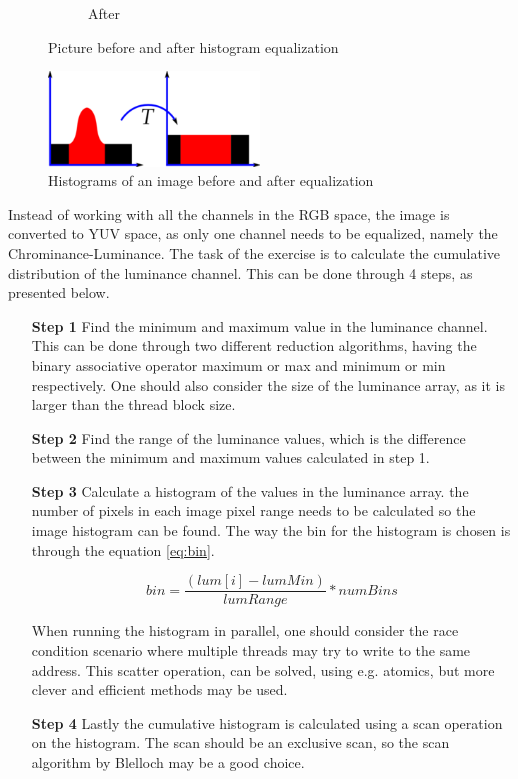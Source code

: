 \begin{figure}[ht]
\begin{subfigure}{.5\textwidth}
		\caption{After}
		\label{fig:ex3-after}
	\end{subfigure}
	\caption{Picture before and after histogram equalization}
	\label{fig:ex3}
\end{figure}  

\begin{figure}[ht]
	\centering
	\includegraphics[width=0.5\textwidth]{figs/exercises/ex3/histogram_eq.png}
	\caption{Histograms of an image before and after equalization \cite{wiki:hist_eq}}	\label{fig:histogram_eq}
\end{figure}  

Instead of working with all the channels in the RGB space, the image is converted to YUV space, as only one channel needs to be equalized, namely the Chrominance-Luminance. The task of the exercise is to calculate the cumulative distribution of the luminance channel. This can be done through 4 steps, as presented below.
\begin{enumerate}
	\item[\textbf{Step 1}]
	Find the minimum and maximum value in the luminance channel. This can be done through two different reduction algorithms, having the binary associative operator maximum or max and minimum or min respectively. One should also consider the size of the luminance array, as it is larger than the  thread block size.  
	\item[\textbf{Step 2}]
	Find the range of the luminance values, which is the difference between the minimum and maximum values calculated in step 1. 
	\item[\textbf{Step 3}]
	Calculate a histogram of the values in the luminance array. the number of pixels in each image pixel range needs to be calculated so the image histogram can be found. The way the bin for the histogram is chosen is through the equation \cref{eq:bin}.
	
	\begin{equation}
	\label{eq:bin}
		bin = \frac{(lum[i]-lumMin)}{lumRange}*numBins
	\end{equation}
	
	When running the histogram in parallel, one should consider the race condition scenario where multiple threads may try to write to the same address. This scatter operation, can be solved, using e.g. atomics, but more clever and efficient methods may be used. 
	\item[\textbf{Step 4}]
	Lastly the cumulative histogram is calculated using a scan operation on the histogram. The scan should be an exclusive scan, so the scan algorithm by Blelloch may be a good choice.  
\end{enumerate}  